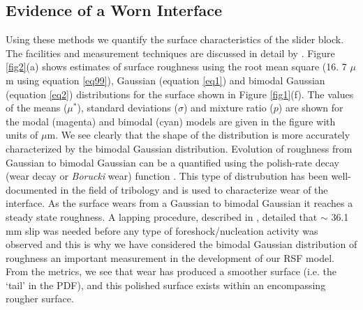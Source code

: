 \documentclass[final,3p, 11pt,authoryear]{elsarticle}
\begin{document}
\subsection{Evidence of a Worn Interface}
\label{SurfaceRoughnessResults}
Using these methods we quantify the surface characteristics of the slider block. The facilities and measurement techniques are discussed in detail by \citet{Selvadurai2017}.  Figure \ref{fig2}(a) shows estimates of surface roughness using the root mean square (16. 7 $\mu$m using equation \eqref{eq99}), Gaussian (equation \eqref{eq1}) and bimodal Gaussian (equation \eqref{eq2}) distributions for the surface shown in Figure \ref{fig1}(f). The values of the means ($\mu^{*}$), standard deviations ($\sigma$) and mixture ratio ($p$) are shown for the modal (magenta) and bimodal (cyan) models are given in the figure with units of $\mu$m.  We see clearly that the shape of the distribution is more accurately characterized by the bimodal Gaussian distribution.  Evolution of roughness from Gaussian to bimodal Gaussian can be a quantified using the polish-rate decay (wear decay or \textit{Borucki} wear) function \citep{Borucki2002, Borucki2004, Ciavarella2016}. This type of distrubution has been well-documented in the field of tribology and is used to characterize wear of the interface. As the surface wears from a Gaussian to bimodal Gaussian it reaches a steady state roughness.  A lapping procedure, described in \citet{Selvadurai2015}, detailed that $\sim$ 36.1 mm slip was needed before any type of foreshock/nucleation activity was observed and this is why we have considered the bimodal Gaussian distribution of roughness an important measurement in the development of our RSF model.  From the metrics, we see that wear has produced a smoother surface (i.e.  the `tail' in the PDF), and this polished surface exists within an encompassing rougher surface.     
\end{document}
